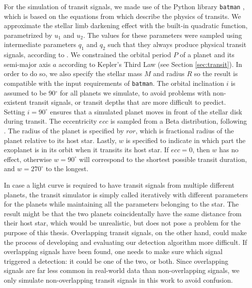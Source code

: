 For the simulation of transit signals, we made use of the Python library \texttt{batman} \citep{kreidberg2015batman}, which is based on the equations from \cite{mandel2002analytic} which describe the physics of transits. We approximate the stellar limb darkening effect with the built-in quadratic function, parametrized by $u_1$ and $u_2$. The values for these parameters were sampled using intermediate parameters $q_1$ and $q_2$ such that they always produce physical transit signals, according to \cite{kipping2013efficient}. We constrained the orbital period $P$ of a planet and its semi-major axis $a$ according to Kepler's Third Law (see Section \ref{sec:transit}). In order to do so, we also specify the stellar mass $M$ and radius $R$ so the result is compatible with the input requirements of \texttt{batman}. The orbital inclination $i$ is assumed to be 90$^\circ$ for all planets we simulate, to avoid problems with non-existent transit signals, or transit depths that are more difficult to predict. Setting $i=90^\circ$ ensures that a simulated planet moves in front of the stellar disk during transit. The eccentricity $ecc$ is sampled from a Beta distribution, following \cite{kipping2013parametrizing}. The radius of the planet is specified by $ror$, which is fractional radius of the planet relative to its host star. Lastly, $w$ is specified to indicate in which part the exoplanet is in its orbit when it transits its host star. If $ecc=0$, then $w$ has no effect, otherwise $w=90^\circ$ will correspond to the shortest possible transit duration, and $w=270^\circ$ to the longest.

In case a light curve is required to have transit signals from multiple different planets, the transit simulator is simply called iteratively with different parameters for the planets while maintaining all the parameters belonging to the star. The result might be that the two planets coincidentally have the same distance from their host star, which would be unrealistic, but does not pose a problem for the purpose of this thesis. Overlapping transit signals, on the other hand, could make the process of developing and evaluating our detection algorithm more difficult. If overlapping signals have been found, one needs to make sure which signal triggered a detection: it could be one of the two, or both. Since overlapping signals are far less common in real-world data than non-overlapping signals, we only simulate non-overlapping transit signals in this work to avoid confusion.

